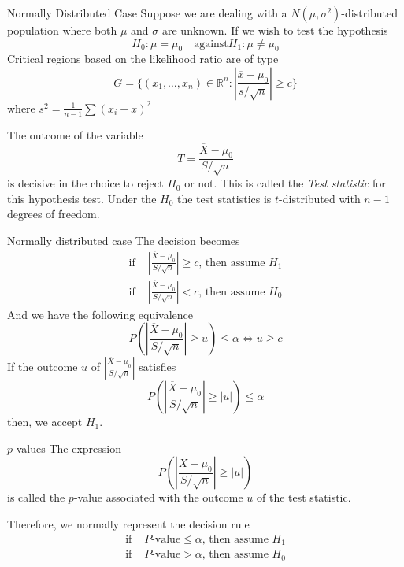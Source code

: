 \documentclass{beamer}
\begin{document}
\begin{frame}{Normally Distributed Case}
	Suppose we are dealing with a $N(\mu,\sigma^2)$-distributed population where both $\mu$ and $\sigma$ are unknown. If we wish to test the hypothesis
	\begin{equation*}
		H_0 \colon \mu=\mu_0 \quad \text{against} H_1 \colon \mu\ne \mu_0
	\end{equation*}
	Critical regions based on the likelihood ratio are of type
	\begin{equation*}
		G= \{(x_1,\ldots, x_n)\in \mathbb{R}^n : \left| \frac{\overline{x}-\mu_0}{s/\sqrt{n}} \right| \ge c\}
	\end{equation*}
	where $s^2= \frac{1}{n-1}\sum (x_i -\overline{x})^2$

	The outcome of the variable 
	\begin{equation*}
		T= \frac{\overline{X}-\mu_0}{S/\sqrt{n}}
	\end{equation*}
	is decisive in the choice to reject $H_0$ or not. This is called the \textit{Test statistic} for this hypothesis test. Under the $H_0$ the test statistics is $t$-distributed with $n-1$ degrees of freedom.
\end{frame}

\begin{frame}{Normally distributed case}
	The decision becomes
	\begin{equation*}
		\begin{split}
		\text{if }& |\frac{\overline{X}-\mu_0}{S/\sqrt{n}}| \ge c \text{, then assume }H_1\\
		\text{if }& |\frac{\overline{X}-\mu_0}{S/\sqrt{n}}| < c \text{, then assume }H_0
		\end{split}
	\end{equation*}
	And we have the following equivalence
	\begin{equation*}
		P(|\frac{\overline{X}-\mu_0}{S/\sqrt{n}}|\ge u)\le \alpha \iff u \ge c
	\end{equation*}
	If the outcome $u$ of $|\frac{\overline{X}-\mu_0}{S/\sqrt{n}}|$ satisfies 
	\begin{equation*}
		P(|\frac{\overline{X}-\mu_0}{S/\sqrt{n}}|\ge |u|)\le \alpha 
	\end{equation*}
	then, we accept $H_1$.
\end{frame}
\begin{frame}{$p$-values}
	The expression 
	\begin{equation*}
			P(|\frac{\overline{X}-\mu_0}{S/\sqrt{n}}|\ge |u|)
	\end{equation*}
	is called the $p$-value associated with the outcome $u$ of the test statistic.
	
	Therefore, we normally represent the decision rule
		\begin{equation*}
		\begin{split}
			\text{if }& P\text{-value} \le \alpha \text{, then assume }H_1\\
			\text{if }& P\text{-value} > \alpha \text{, then assume }H_0
		\end{split}
	\end{equation*}
\end{frame}
\end{document}
